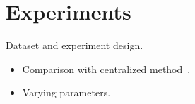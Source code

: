 \section{Experiments}
Dataset and experiment design.

\begin{itemize}
	\item Comparison with centralized method~\cite{huang2014large,ma2013t}.
	\item Varying parameters.
\end{itemize}
